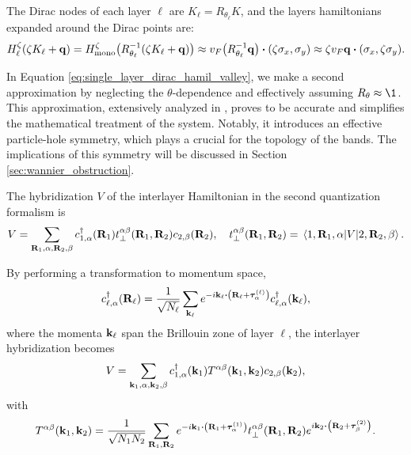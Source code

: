 The Dirac nodes of each layer $\ell$ are $K_{\ell} = R_{\theta_\ell} K$, and the layers hamiltonians expanded around the Dirac points are:
\begin{equation} \label{eq:single_layer_dirac_hamil_valley}
H_\ell^{\zeta}\qty(\zeta K_\ell + \q) = H_{\text{mono}}^\zeta\qty(R_{\theta_\ell}^{-1}\qty(\zeta K_\ell + \q)) \approx v_F \qty(R_{\theta_\ell}^{-1} \q) \vdot \qty(\zeta \s_x, \s_y) \approx \zeta v_F \q \vdot \qty(\s_x, \zeta \s_y).
\end{equation}

In Equation \ref{eq:single_layer_dirac_hamil_valley}, we make a second approximation by neglecting the \(\theta\)-dependence and effectively assuming \(R_\theta \approx \1\). This approximation, extensively analyzed in \cite{all_magic_angles, bernevig_II_2021}, proves to be accurate and simplifies the mathematical treatment of the system. Notably, it introduces an effective particle-hole symmetry, which plays a crucial for the topology of the bands. The implications of this symmetry will be discussed in Section \ref{sec:wannier_obstruction}.


The hybridization $V$ of the interlayer Hamiltonian in the second quantization formalism is \cite{handbook2019}
\begin{equation} \label{eq:interlayer-hopping}
V = \sum_{{\vb{R}}_1,\alpha,{\vb{R}}_2,\beta} c_{1,\alpha}^{\dagger}({\vb{R}}_1) t_\perp^{\alpha\beta}({\vb{R}}_1,{\vb{R}}_2) c_{2,\beta}({\vb{R}}_2), \quad
t_\perp^{\alpha\beta}({\vb{R}}_1,{\vb{R}}_2) =
\mel{1,{\vb{R}}_1,\alpha}{V}{2,{\vb{R}}_2,\beta}.
\end{equation}

By performing a transformation to momentum space,
\begin{equation} \label{eq:blg-fourier}
c_{\ell,\alpha}^\d(\R_\ell) = \frac{1}{\sqrt{N_\ell}} \sum_{\k_\ell}
e^{-i\k_\ell \vdot \qty(\R_\ell + \vtau_{\alpha}^{(\ell)})} c_{\ell,\alpha}^\d(\k_\ell),
\end{equation}
where the momenta ${\vb{k}}_\ell$ span the Brillouin zone of layer $\ell$, the interlayer hybridization becomes
\begin{equation} \label{eq:interlayer-hopping-kspace}
V = \sum_{{\vb{k}}_1,\alpha,{\vb{k}}_2,\beta} c_{1,\alpha}^{\dagger}({\vb{k}}_1) T^{\alpha\beta}({\vb{k}}_1,{\vb{k}}_2) c_{2,\beta}({\vb{k}}_2),
\end{equation}
with
\begin{equation} \label{eq:interlayer-hopping-Tkspace}
T^{\alpha\beta}(\k_1,\k_2) =
\frac{1}{\sqrt{N_1 N_2}} \sum_{\R_1,\R_2} e^{-i\k_1\vdot\qty(\R_1+\vtau_{\alpha}^{(1)})}
t_\perp^{\alpha\beta}(\R_1,\R_2) e^{i\k_2\vdot\qty(\R_2+\vtau_{\beta}^{(2)})}.
\end{equation}

